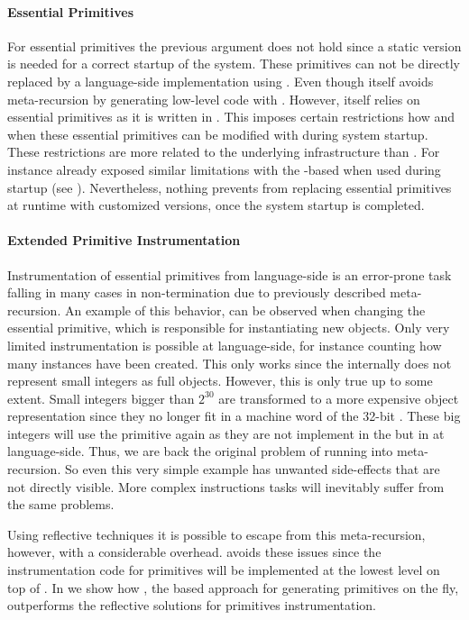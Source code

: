 \paragraph{Essential Primitives}
For essential primitives the previous argument does not hold since a static version is needed for a correct startup of the system.
These primitives can not be directly replaced by a language-side implementation using \WF.
Even though \WF itself avoids meta-recursion by generating low-level code with \B.
However, \B itself relies on essential primitives as it is written in \PH.
This imposes certain restrictions how and when these essential primitives can be modified with \WF during system startup.
These restrictions are more related to the underlying \B infrastructure than \WF.
For instance already exposed similar limitations with the \B-based \FFI when used during startup (see ).
Nevertheless, nothing prevents from replacing essential primitives at runtime with customized versions, once the system startup is completed. 

\paragraph{Extended Primitive Instrumentation}
Instrumentation of essential primitives from lan\-guage-side is an error-prone task falling in many cases in non-termination due to previously described meta-recursion. 
An example of this behavior, can be observed when changing the essential  primitive, which is responsible for instantiating new objects.
Only very limited instrumentation is possible at language-side, for instance counting how many instances have been created.
This only works since the \VM internally does not represent small integers as full objects.
However, this is only true up to some extent.
Small integers bigger than $2^{30}$ are transformed to a more expensive object representation since they no longer fit in a machine word of the 32-bit \VM. 
These big integers will use the  primitive again as they are not implement in the \VM but in at language-side.
Thus, we are back the original problem of running into meta-recursion.
So even this very simple example has unwanted side-effects that are not directly visible.
More complex instructions tasks will inevitably suffer from the same problems.

Using reflective techniques it is possible to escape from this meta-recursion, however, with a considerable overhead.
\WF avoids these issues since the instrumentation code for primitives will be implemented at the lowest level on top of \B.
In  we show how \WF, the \B based approach for generating primitives on the fly, outperforms the reflective solutions for primitives instrumentation. 


